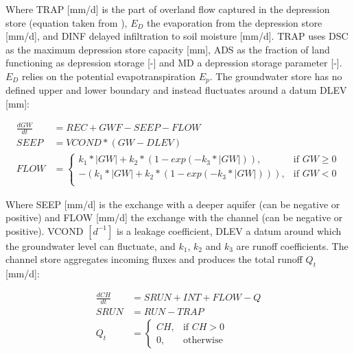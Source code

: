 Where TRAP [mm/d] is the part of overland flow captured in the depression store (equation taken from \citet{Porter1971}), $E_D$ the evaporation from the depression store [mm/d], and DINF delayed infiltration to soil moisture [mm/d]. TRAP uses DSC as the maximum depression store capacity [mm], ADS as the fraction of land functioning as depression storage [-] and MD a depression storage parameter [-]. $E_D$ relies on the potential evapotranspiration $E_p$. The groundwater store has no defined upper and lower boundary and instead fluctuates around a datum DLEV [mm]:

\begin{align}
	\frac{dGW}{dt} &= REC+GWF - SEEP - FLOW\\
	SEEP &= VCOND*\left(GW - DLEV\right) \\
	FLOW &= \begin{cases}
			k_1*|GW|+k_2*\left(1-exp(-k_3*|GW|)\right), &\text{if } GW \geq 0\\
			-\left(k_1*|GW|+k_2*\left(1-exp(-k_3*|GW|)\right)\right), &\text{if } GW < 0\\
		\end{cases}
\end{align}

Where SEEP [mm/d] is the exchange with a deeper aquifer (can be negative or positive) and FLOW [mm/d] the exchange with the channel (can be negative or positive). VCOND $[d^{-1}]$ is a leakage coefficient, DLEV a datum around which the groundwater level can fluctuate, and $k_1$, $k_2$ and $k_3$ are runoff coefficients. The channel store aggregates incoming fluxes and produces the total runoff $Q_t$ [mm/d]:

\begin{align}
	\frac{dCH}{dt} &= SRUN + INT + FLOW - Q \\
	SRUN &= RUN-TRAP \\
	Q_t &= \begin{cases}
		CH, &\text{if } CH > 0\\
		0, &\text{otherwise}
	\end{cases}
\end{align}

\newpage
